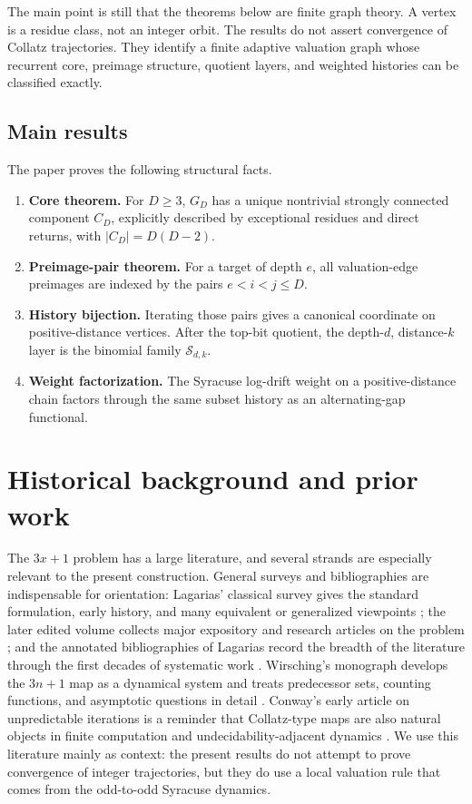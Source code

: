 \documentclass[11pt]{amsart}
\theoremstyle{definition}
\theoremstyle{remark}
\newcommand{\Sfam}{\mathcal S}
\begin{document}
The main point is still that the theorems below are finite graph theory.  A vertex is a residue class, not an integer orbit.  The results do not assert convergence of Collatz trajectories.  They identify a finite adaptive valuation graph whose recurrent core, preimage structure, quotient layers, and weighted histories can be classified exactly.

\subsection*{Main results}

The paper proves the following structural facts.

\begin{enumerate}
\item \textbf{Core theorem.}  For $D\ge3$, $G_D$ has a unique nontrivial strongly connected component $C_D$, explicitly described by exceptional residues and direct returns, with $|C_D|=D(D-2)$.
\item \textbf{Preimage-pair theorem.}  For a target of depth $e$, all valuation-edge preimages are indexed by the pairs $e<i<j\le D$.
\item \textbf{History bijection.}  Iterating those pairs gives a canonical coordinate on positive-distance vertices.  After the top-bit quotient, the depth-$d$, distance-$k$ layer is the binomial family $\Sfam_{d,k}$.
\item \textbf{Weight factorization.}  The Syracuse log-drift weight on a positive-distance chain factors through the same subset history as an alternating-gap functional.
\end{enumerate}

\section{Historical background and prior work}\label{sec:related}

The $3x+1$ problem has a large literature, and several strands are especially relevant to the present construction.  General surveys and bibliographies are indispensable for orientation: Lagarias' classical survey gives the standard formulation, early history, and many equivalent or generalized viewpoints \cite{Lagarias1985}; the later edited volume collects major expository and research articles on the problem \cite{Lagarias2010}; and the annotated bibliographies of Lagarias record the breadth of the literature through the first decades of systematic work \cite{LagariasAnnotated1999,LagariasAnnotated2009}.  Wirsching's monograph develops the $3n+1$ map as a dynamical system and treats predecessor sets, counting functions, and asymptotic questions in detail \cite{Wirsching1998}.  Conway's early article on unpredictable iterations is a reminder that Collatz-type maps are also natural objects in finite computation and undecidability-adjacent dynamics \cite{Conway1972}.  We use this literature mainly as context: the present results do not attempt to prove convergence of integer trajectories, but they do use a local valuation rule that comes from the odd-to-odd Syracuse dynamics.
\end{document}
